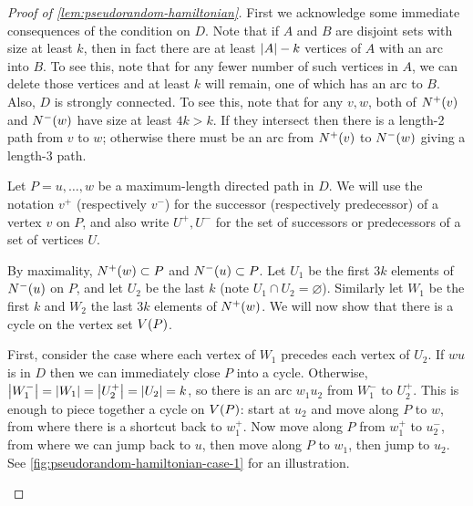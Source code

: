 \documentclass[11pt,english]{article}
\theoremstyle{plain}
\theoremstyle{definition}
\theoremstyle{definition}
\theoremstyle{plain}
\theoremstyle{plain}
\theoremstyle{plain}
\theoremstyle{plain}
\theoremstyle{remark}
\theoremstyle{remark}
\let\originalleft\left
\let\originalright\right
\renewcommand{\left}{\mathopen{}\mathclose\bgroup\originalleft}
\renewcommand{\right}{\aftergroup\egroup\originalright}
\begin{document}
\begin{proof}
[Proof of \ref{lem:pseudorandom-hamiltonian}]First we acknowledge
some immediate consequences of the condition on $D$. Note that if
$A$ and $B$ are disjoint sets with size at least $k$, then in fact
there are at least $\left|A\right|-k$ vertices of $A$ with an arc into $B$.
To see this, note that for any fewer number of such vertices in $A$,
we can delete those vertices and at least $k$ will remain, one of
which has an arc to $B$. Also, $D$ is strongly connected. To see
this, note that for any $v,w$, both of $N^{+}\left(v\right)$ and
$N^{-}\left(w\right)$ have size at least $4k>k$. If they intersect
then there is a length-2 path from $v$ to $w$; otherwise there must
be an arc from $N^{+}\left(v\right)$ to $N^{-}\left(w\right)$ giving
a length-3 path.

Let $P=u,\dots,w$ be a maximum-length directed path in $D$. We will
use the notation $v^{+}$ (respectively $v^{-}$) for the successor
(respectively predecessor) of a vertex $v$ on $P$, and also write
$U^{+},U^{-}$ for the set of successors or predecessors of a set
of vertices $U$.

By maximality, $N^{+}\left(w\right)\subset P$ and $N^{-}\left(u\right)\subset P$.
Let $U_{1}$ be the first $3k$ elements of $N^{-}\left(u\right)$
on $P$, and let $U_{2}$ be the last $k$ (note $U_{1}\cap U_{2}=\varnothing$).
Similarly let $W_{1}$ be the first $k$ and $W_{2}$ the last $3k$
elements of $N^{+}\left(w\right)$. We will now show that there is
a cycle on the vertex set $V\left(P\right)$.

First, consider the case where each vertex of $W_{1}$ precedes each
vertex of $U_{2}$. If $wu$ is in $D$ then we can immediately close
$P$ into a cycle. Otherwise, $\left|W_{1}^{-}\right|=\left|W_{1}\right|=\left|U_{2}^{+}\right|=\left|U_{2}\right|=k$,
so there is an arc $w_{1}u_{2}$ from $W_{1}^{-}$ to $U_{2}^{+}$.
This is enough to piece together a cycle on $V\left(P\right)$: start
at $u_{2}$ and move along $P$ to $w$, from where there is a shortcut
back to $w_{1}^{+}$. Now move along $P$ from $w_{1}^{+}$ to $u_{2}^{-}$,
from where we can jump back to $u$, then move along $P$ to $w_{1}$,
then jump to $u_{2}$. See \ref{fig:pseudorandom-hamiltonian-case-1}
for an illustration.

\begin{figure}[H]
\begin{center}
\hspace{0.5cm}
\begin{tikzpicture}[scale=0.95]


\end{tikzpicture}
\end{center}
\end{figure}
\end{proof}
\end{document}
